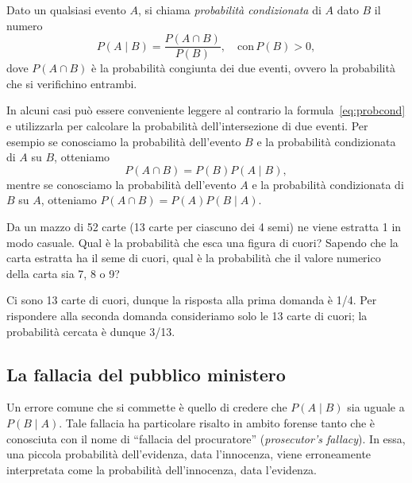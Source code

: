 \begin{defn}
Dato un qualsiasi evento $A$, si chiama \emph{probabilità condizionata} di $A$ dato $B$ il numero
\begin{equation}
P(A \mid B) = \frac{P(A \cap B)}{P(B)}, \quad \text{con}\, P(B) > 0,
\label{eq:probcond}
\end{equation}
dove $P(A\cap B)$ è la probabilità congiunta dei due eventi, ovvero la probabilità che si verifichino entrambi.
\end{defn}

In alcuni casi può essere conveniente leggere al contrario la formula~\eqref{eq:probcond} e utilizzarla per calcolare la probabilità dell'intersezione di due eventi. Per esempio se conosciamo la probabilità dell'evento $B$ e la probabilità condizionata di $A$ su $B$, otteniamo
\begin{equation}
P(A \cap B) = P(B)P(A \mid B),
\label{eq:probcondinv}
\end{equation}
mentre se conosciamo la probabilità dell'evento $A$ e la probabilità condizionata di $B$
su $A$, otteniamo
$P(A \cap B) = P(A)P(B \mid A)$.

\begin{exmp}
Da un mazzo di 52 carte (13 carte per ciascuno dei 4 semi) ne viene estratta 1 in modo casuale. 
Qual è la probabilità che esca una figura di cuori? Sapendo che la carta estratta ha il seme di cuori, qual è la probabilità che il valore numerico della carta sia 7, 8 o 9? 
\end{exmp}

\begin{solu}
Ci sono 13 carte di cuori, dunque la risposta alla prima domanda è 1/4. 
Per rispondere alla seconda domanda consideriamo solo le 13 carte di cuori; la probabilità cercata è dunque 3/13.
\end{solu}


\subsection{La fallacia del pubblico ministero}

Un errore comune che si commette è quello di credere che $P(A \mid B)$ sia uguale a $P(B \mid A)$. 
Tale fallacia ha particolare risalto in ambito forense tanto che è conosciuta con il nome di \enquote{fallacia del procuratore} (\emph{prosecutor's fallacy}).
In essa, una piccola probabilità dell'evidenza, data l'innocenza, viene erroneamente interpretata come la probabilità dell'innocenza, data l'evidenza.

